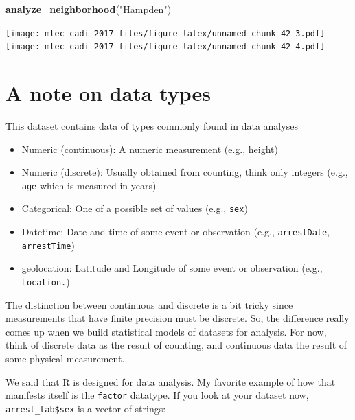 \documentclass[]{book}
\newenvironment{Shaded}{\begin{snugshade}}{\end{snugshade}}
\newcommand{\KeywordTok}[1]{\textcolor[rgb]{0.13,0.29,0.53}{\textbf{#1}}}
\newcommand{\StringTok}[1]{\textcolor[rgb]{0.31,0.60,0.02}{#1}}
\newcommand{\OperatorTok}[1]{\textcolor[rgb]{0.81,0.36,0.00}{\textbf{#1}}}
\newcommand{\NormalTok}[1]{#1}
\providecommand{\tightlist}{%
  \setlength{\itemsep}{0pt}\setlength{\parskip}{0pt}}
\theoremstyle{definition}
\theoremstyle{definition}
\theoremstyle{remark}
\begin{document}
\begin{Shaded}
\begin{Highlighting}[]
\KeywordTok{analyze_neighborhood}\NormalTok{(}\StringTok{"Hampden"}\NormalTok{)}
\end{Highlighting}
\end{Shaded}

\texttt{[image: mtec\_cadi\_2017\_files/figure-latex/unnamed-chunk-42-3.pdf]}
\texttt{[image: mtec\_cadi\_2017\_files/figure-latex/unnamed-chunk-42-4.pdf]}

\section{A note on data types}\label{a-note-on-data-types}

This dataset contains data of types commonly found in data analyses

\begin{itemize}
\tightlist
\item
  Numeric (continuous): A numeric measurement (e.g., height)\\
\item
  Numeric (discrete): Usually obtained from counting, think only
  integers (e.g., \texttt{age} which is measured in years)\\
\item
  Categorical: One of a possible set of values (e.g., \texttt{sex})\\
\item
  Datetime: Date and time of some event or observation (e.g.,
  \texttt{arrestDate}, \texttt{arrestTime})\\
\item
  geolocation: Latitude and Longitude of some event or observation
  (e.g., \texttt{Location.})
\end{itemize}

The distinction between continuous and discrete is a bit tricky since
measurements that have finite precision must be discrete. So, the
difference really comes up when we build statistical models of datasets
for analysis. For now, think of discrete data as the result of counting,
and continuous data the result of some physical measurement.

We said that R is designed for data analysis. My favorite example of how
that manifests itself is the \texttt{factor} datatype. If you look at
your dataset now, \texttt{arrest\_tab\$sex} is a vector of strings:

\begin{Shaded}
\end{Shaded}
\end{document}
